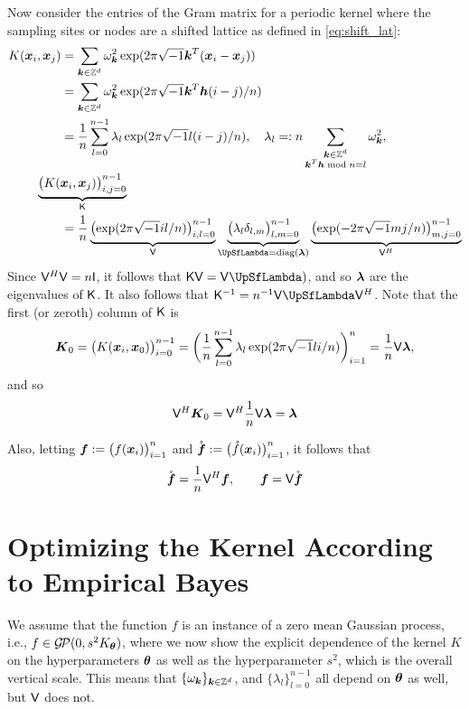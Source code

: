 \documentclass{amsart}
\newcommand{\rvf}{\mathring{\vf}}
\newcommand{\gp}{\mathcal{G}\!\mathcal{P}}
\begin{document}
Now consider the entries of the Gram matrix for a periodic kernel where the sampling sites or nodes are a shifted lattice as defined in \eqref{eq:shift_lat}:
\begin{align*}
    K(\vx_i,\vx_j)  &= \sum_{\vk \in \integers^d} \omega_{\vk}^2 \exp(2 \pi \sqrt{-1} \vk^T(\vx_i - \vx_j)) \\
    & = \sum_{\vk \in \integers^d} \omega_{\vk}^2 \exp(2 \pi \sqrt{-1} \vk^T \vh (i-j)/n) \\
    & = \frac 1n \sum_{l = 0}^{n-1} \lambda_l \exp(2 \pi \sqrt{-1} l (i-j)/n), \quad \lambda_l =: n\sum_{\substack{\vk \in \integers^d \\ \vk^T\vh \bmod n = l}} \omega_{\vk}^2, \\
    \MoveEqLeft \underbrace{\bigl ( K(\vx_i,\vx_j)\bigr)_{i,j = 0}^{n-1}}_{\mK} \\
    &
    = \frac 1n \underbrace{\bigl ( \exp(2 \pi \sqrt{-1} il/n) \bigr)_{i,l = 0}^{n-1}}_{\mV} 
    \underbrace{\bigl ( \lambda_l \delta_{l,m} \bigr)_{l,m = 0}^{n-1}}_{\mLambda = \diag(\vlambda)} 
    \underbrace{\bigl ( \exp(- 2 \pi \sqrt{-1} mj/n) \bigr)_{m,j = 0}^{n-1}}_{\mV^H}
\end{align*}
Since $\mathsf{V}^H \mathsf{V} = n \mathsf{I}$, it follows that $\mK \mV  =\mV \mLambda)$, and so $\boldsymbol{\lambda}$ are the eigenvalues of $\mathsf{K}$.  It also follows that $\mK^{-1} = n^{-1} \mV \mLambda \mV^H$.  Note that the first (or zeroth) column of $\mathsf{K}$ is 
\begin{equation*}
    \boldsymbol{K}_0 = \bigl ( K(\boldsymbol{x}_i,\boldsymbol{x}_0)\bigr)_{i = 0}^{n-1}
    = \biggl( \frac 1n \sum_{l = 0}^{n-1} \lambda_l \exp(2 \pi \sqrt{-1} l i/n)\biggr)_{i=1}^n = \frac 1n \mathsf{V} \boldsymbol{\lambda},
\end{equation*}
and so 
\begin{equation*}
    \mathsf{V}^{H} \boldsymbol{K}_0 = \mathsf{V}^{H} \frac 1n \mathsf{V} \boldsymbol{\lambda} = \boldsymbol{\lambda} 
\end{equation*}

Also, letting $\boldsymbol{f} := \bigl( f(\boldsymbol{x}_i) \bigr)_{i=1}^n$ and $\rvf := \bigl( \rf(\vx_i) \bigr)_{i=1}^n$, it follows that
\begin{equation}
    \rvf = \frac 1n \mV^H \vf, \qquad \vf = \mV \rvf
\end{equation}

\section{Optimizing the Kernel According to Empirical Bayes}
We assume that the function $f$ is an instance of a zero mean Gaussian process, i.e., $f \in \gp(0,s^2K_{\vtheta})$, where we now show the explicit dependence of the
kernel $K$ on the hyperparameters $\boldsymbol{\theta}$ as well as the hyperparameter $s^2$, which is the overall vertical scale.
This means that $\{\omega_{\boldsymbol{k}}\}_{\boldsymbol{k} \in \mathbb{Z}^d}$, and $\{\lambda_l \}_{l=0}^{n-1}$ all depend on $\boldsymbol{\theta}$ as well, but $\mathsf{V}$ does not.
\end{document}
